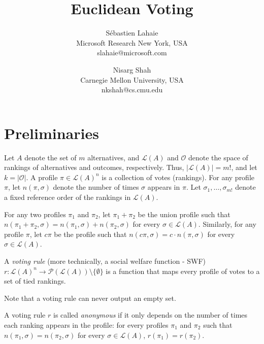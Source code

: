\documentclass[10pt,letterpaper]{article}
\title{Euclidean Voting}
\author{S\'{e}bastien Lahaie\\Microsoft Research New York, USA\\slahaie@microsoft.com \and Nisarg Shah\\Carnegie Mellon University, USA\\nkshah@cs.cmu.edu}
\newcommand{\calL}{{\mathcal{L}}}
\newcommand{\rank}{{\calL(A)}}
\newcommand{\calO}{{\mathcal{O}}}
\newcommand{\calP}{{\mathcal{P}}}
\newenvironment{definition}[1][Definition]{\begin{trivlist}
\item[\hskip \labelsep {\bfseries #1}]}{\end{trivlist}}
\begin{document}
\maketitle


\section{Preliminaries}

Let $A$ denote the set of $m$ alternatives, and $\rank$ and $\calO$ denote the space of rankings of alternatives and outcomes, respectively. Thus, $|\rank| = m!$, and let $k = |\calO|$. A profile $\pi \in \rank^n$ is a collection of votes (rankings). For any profile $\pi$, let $n(\pi,\sigma)$ denote the number of times $\sigma$ appears in $\pi$. Let $\sigma_1,\ldots,\sigma_{m!}$ denote a fixed reference order of the rankings in $\rank$. 

For any two profiles $\pi_1$ and $\pi_2$, let $\pi_1+\pi_2$ be the union profile such that $n(\pi_1+\pi_2,\sigma) = n(\pi_1,\sigma)+n(\pi_2,\sigma)$ for every $\sigma \in \rank$. Similarly, for any profile $\pi$, let $c \pi$ be the profile such that $n(c \pi,\sigma) = c \cdot n(\pi,\sigma)$ for every $\sigma \in \rank$. 


\begin{definition}[Voting Rule]
A \emph{voting rule} (more technically, a social welfare function - SWF) $r : \rank^n \rightarrow \calP(\rank)\setminus\{\emptyset\}$ is a function that maps every profile of votes to a set of tied rankings. 
\end{definition}

Note that a voting rule can never output an empty set.


\begin{definition}[Anonymity]
A voting rule $r$ is called \emph{anonymous} if it only depends on the number of times each ranking appears in the profile: for every profiles $\pi_1$ and $\pi_2$ such that $n(\pi_1,\sigma) = n(\pi_2,\sigma)$ for every $\sigma \in \rank$, $r(\pi_1) = r(\pi_2)$. 
\end{definition}

\end{document}
